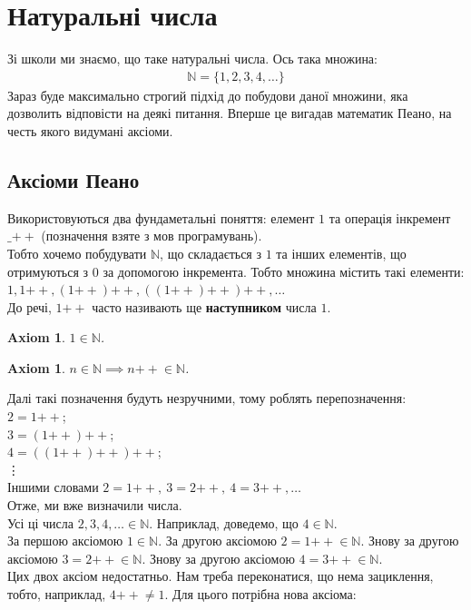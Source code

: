 \documentclass[a4paper, 14pt]{extarticle}
\theoremstyle{theoremdd}
\theoremstyle{theoremdd}
\theoremstyle{theoremdd}
\newtheorem{axiom}[theorem]{Axiom}
\theoremstyle{theoremdd}
\theoremstyle{theoremdd}
\theoremstyle{theoremdd}
\theoremstyle{theoremdd}
\theoremstyle{theoremdd}
\theoremstyle{theoremdd}
\theoremstyle{theoremdd}
\theoremstyle{theoremdd}
\theoremstyle{theoremdd}
\theoremstyle{theoremdd}
\theoremstyle{theoremdd}
\theoremstyle{theoremdd}
\theoremstyle{theoremdd}
\newcommand{\plusplus}{\!\!\mathrel{++}}
\begin{document}
\tableofcontents
\newpage
\section{Натуральні числа}
Зі школи ми знаємо, що таке натуральні числа. Ось така множина:
\begin{align*}
\mathbb{N} = \{1,2,3,4,\dots \}
\end{align*}
Зараз буде максимально строгий підхід до побудови даної множини, яка дозволить відповісти на деякі питання. Вперше це вигадав математик Пеано, на честь якого видумані аксіоми.

\subsection{Аксіоми Пеано}
Використовуються два фундаметальні поняття: елемент $1$ та операція інкремент $\_\plusplus$ (позначення взяте з мов програмувань).\\
Тобто хочемо побудувати $\mathbb{N}$, що складається з $1$ та інших елементів, що отримуються з $0$ за допомогою інкремента. Тобто множина містить такі елементи:\\
$1, 1 \plusplus , (1 \plusplus) \plusplus, ((1 \plusplus)\plusplus)\plusplus, \dots$\\
До речі, $1 \plusplus$ часто називають ще \textbf{наступником} числа $1$.

\begin{axiom}
$1 \in \mathbb{N}$.
\end{axiom}

\begin{axiom}
$n \in \mathbb{N} \implies n \plusplus \in \mathbb{N}$.
\end{axiom}

Далі такі позначення будуть незручними, тому роблять перепозначення:\\
$2 = 1\plusplus$;\\
$3 = (1\plusplus)\plusplus$;\\
$4 = ((1\plusplus)\plusplus)\plusplus$;\\
\vdots \\
Іншими словами $2 = 1\plusplus,\ 3 = 2\plusplus,\ 4 = 3\plusplus, \dots$\\
Отже, ми вже визначили числа.
\bigskip \\
Усі ці числа $2,3,4,\dots \in \mathbb{N}$. Наприклад, доведемо, що $4 \in \mathbb{N}$.\\
За першою аксіомою $1 \in \mathbb{N}$. За другою аксіомою $2 = 1\plusplus \in \mathbb{N}$. Знову за другою аксіомою $3 = 2\plusplus \in \mathbb{N}$. Знову за другою аксіомою $4 = 3\plusplus \in \mathbb{N}$.
\bigskip \\
Цих двох аксіом недостатньо. Нам треба переконатися, що нема зациклення, тобто, наприклад, $4\plusplus \neq 1$. Для цього потрібна нова аксіома:
\end{document}
